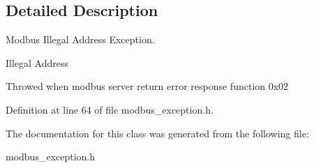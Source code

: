 \subsection{Detailed Description}
Modbus Illegal Address Exception. 

Illegal Address

Throwed when modbus server return error response function 0x02 

Definition at line 64 of file modbus\+\_\+exception.\+h.



The documentation for this class was generated from the following file\+:\begin{DoxyCompactItemize}
\item 
modbus\+\_\+exception.\+h\end{DoxyCompactItemize}
